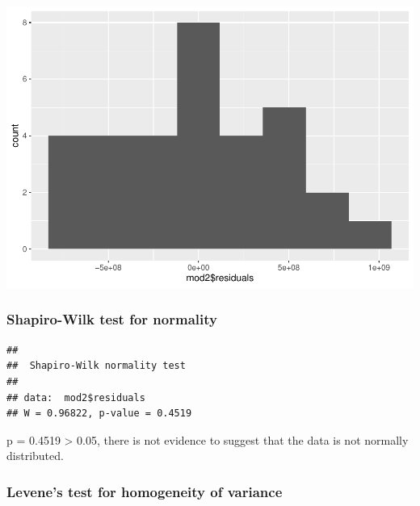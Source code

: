 \documentclass[
]{article}
\newenvironment{Shaded}{\begin{snugshade}}{\end{snugshade}}
\newcommand{\AttributeTok}[1]{\textcolor[rgb]{0.13,0.29,0.53}{#1}}
\newcommand{\FunctionTok}[1]{\textcolor[rgb]{0.13,0.29,0.53}{\textbf{#1}}}
\newcommand{\NormalTok}[1]{#1}
\newcommand{\SpecialCharTok}[1]{\textcolor[rgb]{0.81,0.36,0.00}{\textbf{#1}}}
\begin{document}
\begin{Shaded}
\end{Shaded}

\includegraphics{analysis_files/figure-latex/residuals-group3-1.pdf}

\subsubsection{Shapiro-Wilk test for
normality}\label{shapiro-wilk-test-for-normality-1}

\begin{Shaded}
\end{Shaded}

\begin{verbatim}
## 
##  Shapiro-Wilk normality test
## 
## data:  mod2$residuals
## W = 0.96822, p-value = 0.4519
\end{verbatim}

p = 0.4519 \textgreater{} 0.05, there is not evidence to suggest that
the data is not normally distributed.

\subsubsection{Levene's test for homogeneity of
variance}\label{levenes-test-for-homogeneity-of-variance-1}
\end{document}
